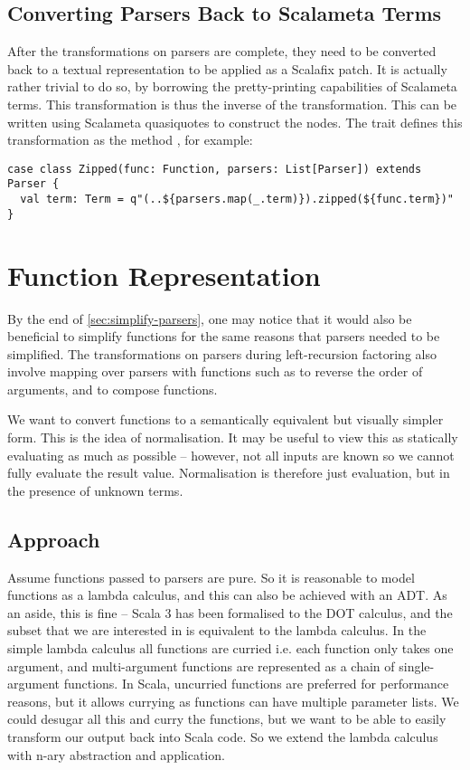 \documentclass[../../main.tex]{subfiles}
\begin{document}
\subsection{Converting Parsers Back to Scalameta Terms}
After the transformations on parsers are complete, they need to be converted back to a textual representation to be applied as a Scalafix patch.
It is actually rather trivial to do so, by borrowing the pretty-printing capabilities of Scalameta terms.
This transformation is thus the inverse of the  transformation.
This can be written using Scalameta quasiquotes to construct the  nodes.
The  trait defines this transformation as the method , for example:
\begin{verbatim}
case class Zipped(func: Function, parsers: List[Parser]) extends Parser {
  val term: Term = q"(..${parsers.map(_.term)}).zipped(${func.term})"
}
\end{verbatim}

\section{Function Representation}\label{sec:function-representation}
By the end of \cref{sec:simplify-parsers}, one may notice that it would also be beneficial to simplify functions for the same reasons that parsers needed to be simplified.
The transformations on parsers during left-recursion factoring also involve mapping over parsers with functions such as  to reverse the order of arguments, and  to compose functions.

We want to convert functions to a semantically equivalent but visually simpler form.
This is the idea of normalisation.
It may be useful to view this as statically evaluating as much as possible -- however, not all inputs are known so we cannot fully evaluate the result value.
Normalisation is therefore just evaluation, but in the presence of unknown terms.

\subsection{Approach}
Assume functions passed to parsers are pure.
So it is reasonable to model functions as a lambda calculus, and this can also be achieved with an ADT.
As an aside, this is fine -- Scala 3 has been formalised to the DOT calculus, and the subset that we are interested in is equivalent to the lambda calculus.
In the simple lambda calculus all functions are curried i.e. each function only takes one argument, and multi-argument functions are represented as a chain of single-argument functions.
In Scala, uncurried functions are preferred for performance reasons, but it allows currying as functions can have multiple parameter lists.
We could desugar all this and curry the functions, but we want to be able to easily transform our output back into Scala code.
So we extend the lambda calculus with n-ary abstraction and application.
\end{document}
